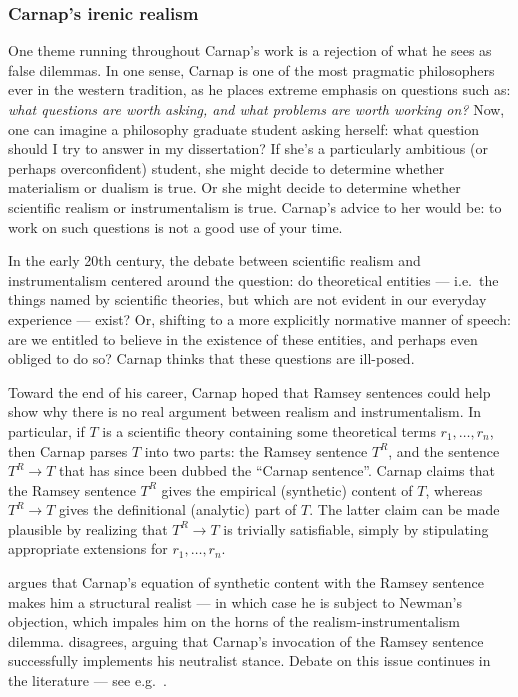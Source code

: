 \subsubsection*{Carnap's irenic realism}

One theme running throughout Carnap's work is a rejection of what he
sees as false dilemmas.  In one sense, Carnap is one of the most
pragmatic philosophers ever in the western tradition, as he places
extreme emphasis on questions such as: {\it what questions are worth
  asking, and what problems are worth working on?}  Now, one can
imagine a philosophy graduate student asking herself: what question
should I try to answer in my dissertation?  If she's a particularly
ambitious (or perhaps overconfident) student, she might decide to
determine whether materialism or dualism is true.  Or she might decide
to determine whether scientific realism or instrumentalism is true.
Carnap's advice to her would be: to work on such questions is not a
good use of your time.

In the early 20th century, the debate between scientific realism and
instrumentalism centered around the question: do theoretical entities
--- i.e.\ the things named by scientific theories, but which are not
evident in our everyday experience --- exist?  Or, shifting to a more
explicitly normative manner of speech: are we entitled to believe in
the existence of these entities, and perhaps even obliged to do so?
Carnap thinks that these questions are ill-posed.

Toward the end of his career, Carnap hoped that Ramsey sentences could
help show why there is no real argument between realism and
instrumentalism.  In particular, if $T$ is a scientific theory
containing some theoretical terms $r_1,\dots ,r_n$, then Carnap parses
$T$ into two parts: the Ramsey sentence $T^R$, and the sentence
$T^R\to T$ that has since been dubbed the ``Carnap sentence''.  Carnap
claims that the Ramsey sentence $T^R$ gives the empirical (synthetic)
content of $T$, whereas $T^R\to T$ gives the definitional (analytic)
part of $T$.  The latter claim can be made plausible by realizing that
$T^R\to T$ is trivially satisfiable, simply by stipulating appropriate
extensions for $r_1,\dots ,r_n$.

\cite{psillos2000} argues that Carnap's equation of synthetic content
with the Ramsey sentence makes him a structural realist --- in which
case he is subject to Newman's objection, which impales him on the
horns of the realism-instrumentalism dilemma.  \cite{friedman2011}
disagrees, arguing that Carnap's invocation of the Ramsey sentence
successfully implements his neutralist stance.  Debate on this issue
continues in the literature --- see e.g.\ \cite{uebel2011,beni}.


